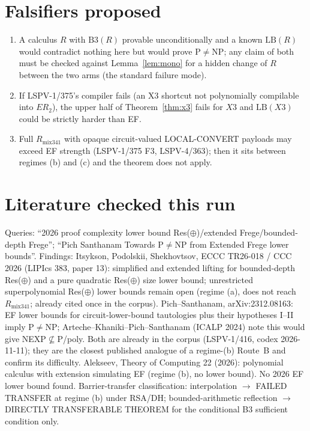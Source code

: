 \documentclass[11pt]{article}
\theoremstyle{definition}
\begin{document}
\section{Falsifiers proposed}
\begin{enumerate}
\item[F1] A calculus $R$ with $\mathrm{B3}(R)$ provable unconditionally and a known $\mathrm{LB}(R)$ would
contradict nothing here but would prove P$\ne$NP; any claim of both must be checked against
Lemma~\ref{lem:mono} for a hidden change of $R$ between the two arms (the standard failure mode).
\item[F2] If LSPV-1/375's compiler fails (an X3 shortcut not polynomially compilable into $ER_2$), the
upper half of Theorem~\ref{thm:x3} fails for $X3$ and $\mathrm{LB}(X3)$ could be strictly harder than EF.
\item[F3] Full $R_{\mathrm{mix341}}$ with opaque circuit-valued LOCAL-CONVERT payloads may exceed EF strength
(LSPV-1/375 F3, LSPV-4/363); then it sits between regimes (b) and (c) and the theorem does not apply.
\end{enumerate}

\section{Literature checked this run}
Queries: ``2026 proof complexity lower bound Res($\oplus$)/extended Frege/bounded-depth Frege'';
``Pich Santhanam Towards P$\ne$NP from Extended Frege lower bounds''. Findings:
Itsykson, Podolskii, Shekhovtsov, ECCC TR26-018 / CCC 2026 (LIPIcs 383, paper 13): simplified and extended
lifting for bounded-depth Res($\oplus$) and a pure quadratic Res($\oplus$) size lower bound; unrestricted
superpolynomial Res($\oplus$) lower bounds remain open (regime (a), does not reach $R_{\mathrm{mix341}}$; already
cited once in the corpus). Pich--Santhanam, arXiv:2312.08163: EF lower bounds for circuit-lower-bound
tautologies plus their hypotheses I--II imply P$\ne$NP; Arteche--Khaniki--Pich--Santhanam (ICALP 2024) note this
would give NEXP$\not\subseteq$P/poly. Both are already in the corpus (LSPV-1/416, codex 2026-11-11); they are the
closest published analogue of a regime-(b) Route~B and confirm its difficulty. Alekseev, Theory of Computing 22
(2026): polynomial calculus with extension simulating EF (regime (b), no lower bound). No 2026 EF lower bound found.
Barrier-transfer classification: interpolation $\to$ FAILED TRANSFER at regime (b) under RSA/DH; bounded-arithmetic
reflection $\to$ DIRECTLY TRANSFERABLE THEOREM for the conditional B3 sufficient condition only.
\end{document}
